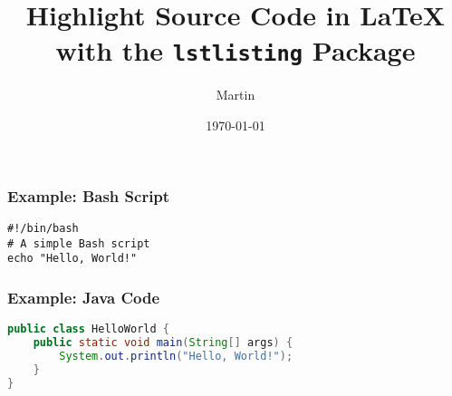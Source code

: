 \documentclass{beamer}
\title{Highlight Source Code in \LaTeX{} with the \texttt{lstlisting} Package}
\author{Martin}
\date{\today}
\begin{document}
\begin{frame}
  \titlepage
\end{frame}

\begin{frame}[fragile]
\frametitle{Example: Bash Script}
\begin{lstlisting}
#!/bin/bash
# A simple Bash script
echo "Hello, World!"
\end{lstlisting}
\end{frame}

\begin{frame}[fragile]
\frametitle{Example: Java Code}
\begin{lstlisting}[language=Java]
public class HelloWorld {
    public static void main(String[] args) {
        System.out.println("Hello, World!");
    }
}
\end{lstlisting}
\end{frame}
\end{document}

